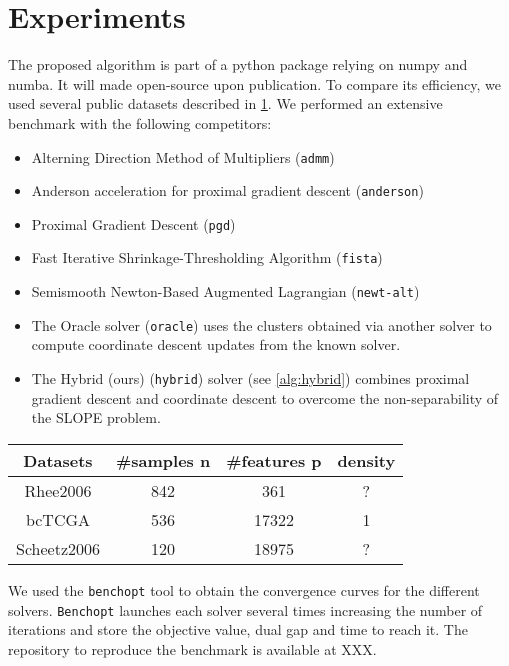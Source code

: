 \section{Experiments}\label{sec:experiments}

The proposed algorithm is part of a python package relying on numpy and numba.
It will made open-source upon publication. To compare its efficiency, we used several public datasets described in \cref{table:datasets}.
We performed an extensive benchmark with the following competitors:
\begin{itemize}[noitemsep]
    \item Alterning Direction Method of Multipliers (\texttt{admm}) \cite{boyd2010}
    \item Anderson acceleration for proximal gradient descent (\texttt{anderson}) \cite{zhang2020}
    \item Proximal Gradient Descent (\texttt{pgd}) \cite{combettes2005}
    \item Fast Iterative Shrinkage-Thresholding Algorithm (\texttt{fista}) \cite{beck2009}
    \item Semismooth Newton-Based Augmented Lagrangian (\texttt{newt-alt}) \cite{Ziyan2019}
    \item The Oracle solver (\texttt{oracle}) uses the clusters obtained via another
     solver to compute coordinate descent updates from the known solver.
    \item The Hybrid (ours) (\texttt{hybrid}) solver (see \cref{alg:hybrid}) combines proximal gradient descent
     and coordinate descent to overcome the non-separability of the SLOPE problem.
\end{itemize}

\begin{table}[]
    \centering
    \label{table:datasets}
    \begin{tabular}{cccc}
    \hline
    Datasets    & \#samples n & \#features p & density \\ \hline
    Rhee2006    & 842         & 361          & ?       \\ 
    bcTCGA      & 536         & \num{17322}        & 1       \\
    Scheetz2006 & 120         & \num{18975}        & ?       \\ \hline
    \end{tabular}
\end{table}

We used the \texttt{benchopt} \cite{moreau2022benchopt} tool to obtain the convergence curves for the different solvers.
\texttt{Benchopt} launches each solver several times increasing the number of iterations and store the objective value, dual gap and time to reach it.
The repository to reproduce the benchmark is available at XXX.

